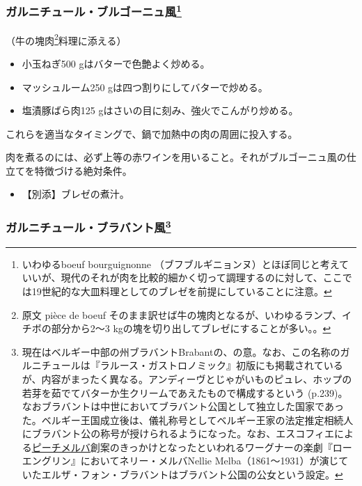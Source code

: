 \begin{recette}
\atoaki{}

\hypertarget{garniture-a-la-bourguignonne}{%
\subsubsection[ガルニチュール・ブルゴーニュ風]{\texorpdfstring{ガルニチュール・ブルゴーニュ風\footnote{いわゆるboeuf
  bourguignonne
  （ブフブルギニョンヌ）とほぼ同じと考えていいが、現代のそれが肉を比較的細かく切って調理するのに対して、ここでは19世紀的な大皿料理としてのブレゼを前提にしていることに注意。}}{ガルニチュール・ブルゴーニュ風}}\label{garniture-a-la-bourguignonne}}



（牛の塊肉\footnote{原文 pièce de boeuf
  そのまま訳せば牛の塊肉となるが、いわゆるランプ、イチボの部分から2〜3
  kgの塊を切り出してブレゼにすることが多い。。}料理に添える）

\begin{itemize}
\item
  小玉ねぎ500 gはバターで色艶よく炒める。
\item
  マッシュルーム250 gは四つ割りにしてバターで炒める。
\item
  塩漬豚ばら肉125 gはさいの目に刻み、強火でこんがり炒める。
\end{itemize}

これらを適当なタイミングで、鍋で加熱中の肉の周囲に投入する。

肉を煮るのには、必ず上等の赤ワインを用いること。それがブルゴーニュ風の仕立てを特徴づける絶対条件。

\begin{itemize}
\tightlist
\item
  【別添】ブレゼの煮汁。
\end{itemize}

\atoaki{}

\hypertarget{garniture-brabanconne}{%
\subsubsection[ガルニチュール・ブラバント風]{\texorpdfstring{ガルニチュール・ブラバント風\footnote{現在はベルギー中部の州ブラバントBrabantの、の意。なお、この名称のガルニチュールは『ラルース・ガストロノミック』初版にも掲載されているが、内容がまったく異なる。アンディーヴとじゃがいものピュレ、ホップの若芽を茹でてバターか生クリームであえたもので構成するという
  (p.239)。なおブラバントは中世においてブラバント公国として独立した国家であった。ベルギー王国成立後は、儀礼称号としてベルギー王家の法定推定相続人にブラバント公の称号が授けられるようになった。なお、エスコフィエによる\protect\hyperlink{peches-melba}{ピーチメルバ}創案のきっかけとなったといわれるワーグナーの楽劇『ローエングリン』においてネリー・メルバNellie
  Melba（1861〜1931）が演じていたエルザ・フォン・ブラバントはブラバント公国の公女という設定。}}{ガルニチュール・ブラバント風}}\label{garniture-brabanconne}}


\end{recette}
